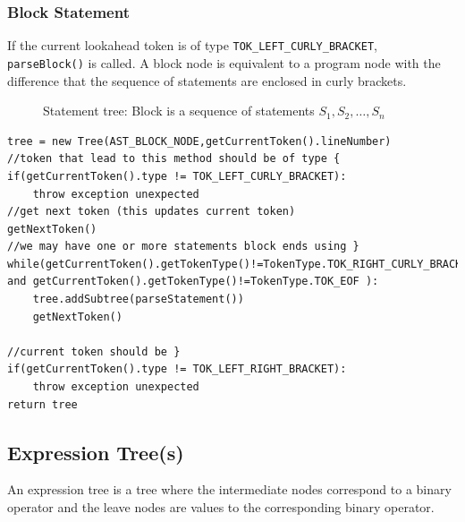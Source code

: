 \subsubsection{Block Statement}
\label{sec:block statement tree}
If the current lookahead token is of type \verb!TOK_LEFT_CURLY_BRACKET!, \verb!parseBlock()! is called. 
A block node is equivalent to a program node with the difference that the sequence of statements are enclosed in curly brackets.
\begin{figure}[H]
    \centering
    \caption{Statement tree: Block is a sequence of statements $S_1,S_2,\ldots,S_n$}
    \label{fig:tinylang block tree}
\end{figure}
\begin{lstlisting}[caption=PSEUDOCODE for building a block tree (\emph{parseBlock()}),label=listing:block statement tree]
tree = new Tree(AST_BLOCK_NODE,getCurrentToken().lineNumber)
//token that lead to this method should be of type {
if(getCurrentToken().type != TOK_LEFT_CURLY_BRACKET):
    throw exception unexpected 
//get next token (this updates current token)
getNextToken()    
//we may have one or more statements block ends using }
while(getCurrentToken().getTokenType()!=TokenType.TOK_RIGHT_CURLY_BRACKET and getCurrentToken().getTokenType()!=TokenType.TOK_EOF ):
    tree.addSubtree(parseStatement())
    getNextToken()

//current token should be }
if(getCurrentToken().type != TOK_LEFT_RIGHT_BRACKET):
    throw exception unexpected 
return tree
\end{lstlisting}



\subsection{Expression Tree(s)}
\label{sec:expression tree building }
An expression tree is a tree where the intermediate nodes correspond to a binary operator and the leave nodes are values to the corresponding binary operator.

